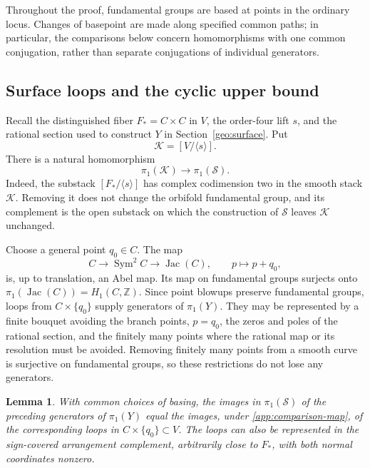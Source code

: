 \documentclass[11pt,reqno]{amsart}
\numberwithin{equation}{section}
\newtheorem{lemma}[theorem]{Lemma}
\theoremstyle{definition}
\theoremstyle{remark}
\newcommand{\Z}{\mathbb Z}
\newcommand{\cS}{\mathcal S}
\DeclareMathOperator{\Sym}{Sym}
\DeclareMathOperator{\Jac}{Jac}
\begin{document}
Throughout the proof, fundamental groups are based at points in the
ordinary locus.  Changes of basepoint are made along specified common
paths; in particular, the comparisons below concern homomorphisms with
one common conjugation, rather than separate conjugations of individual
generators.

\subsection{Surface loops and the cyclic upper bound}

Recall the distinguished fiber $F_*=C\times C$ in $V$, the order-four
lift $s$, and the rational section used to construct $Y$ in
Section~\ref{geo:surface}.  Put
\[
 \mathcal K=[V/\langle s\rangle].
\]
There is a natural homomorphism
\begin{equation}\label{app:comparison-map}
 \pi_1(\mathcal K)\longrightarrow\pi_1(\cS).
\end{equation}
Indeed, the substack $[F_*/\langle s\rangle]$ has complex codimension
two in the smooth stack $\mathcal K$.  Removing it does not change the
orbifold fundamental group, and its complement is the open substack on
which the construction of $\cS$ leaves $\mathcal K$ unchanged.

Choose a general point $q_0\in C$.  The map
\[
 C\longrightarrow\Sym^2 C\longrightarrow\Jac(C),
 \qquad p\longmapsto p+q_0,
\]
is, up to translation, an Abel map.  Its map on fundamental groups
surjects onto $\pi_1(\Jac(C))=H_1(C,\Z)$.  Since point blowups preserve
fundamental groups, loops from $C\times\{q_0\}$ supply generators of
$\pi_1(Y)$.  They may be represented by a finite bouquet avoiding the
branch points, $p=q_0$, the zeros and poles of the rational section,
and the finitely many points where the rational map or its resolution
must be avoided.  Removing finitely many points from a smooth curve is
surjective on fundamental groups, so these restrictions do not lose any
generators.

\begin{lemma}\label{app:surface-comparison}
With common choices of basing, the images in $\pi_1(\cS)$ of the
preceding generators of $\pi_1(Y)$ equal the images, under
\eqref{app:comparison-map}, of the corresponding loops in
$C\times\{q_0\}\subset V$.  The loops can also be represented in the
sign-covered arrangement complement, arbitrarily close to $F_*$, with
both normal coordinates nonzero.
\end{lemma}
\end{document}
